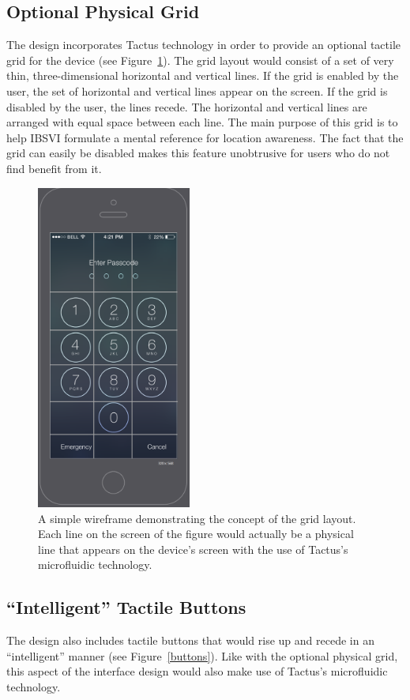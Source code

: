 \documentclass[11pt]{article}
\begin{document}
\subsection{Optional Physical Grid}
The design incorporates Tactus technology in order to provide an optional tactile grid for the device (see Figure~\ref{wireframe-grid}). The grid layout would consist of a set of very thin, three-dimensional horizontal and vertical lines. If the grid is enabled by the user, the set of horizontal and vertical lines appear on the screen. If the grid is disabled by the user, the lines recede. The horizontal and vertical lines are arranged with equal space between each line. The main purpose of this grid is to help IBSVI formulate a mental reference for location awareness. The fact that the grid can easily be disabled makes this feature unobtrusive for users who do not find benefit from it.


\begin{figure}[ht]
\centering
\includegraphics[width=2in]{wireframe-grid.png} 
\caption{A simple wireframe demonstrating the concept of the grid layout. Each line on the screen of the figure would actually be a physical line that appears on the device's screen with the use of Tactus's microfluidic technology.}
\label{wireframe-grid}
\end{figure}

\subsection{``Intelligent'' Tactile Buttons}
The design also includes tactile buttons that would rise up and recede in an ``intelligent'' manner (see Figure~\ref{buttons}). Like with the optional physical grid, this aspect of the interface design would also make use of Tactus's microfluidic technology.
\end{document}
